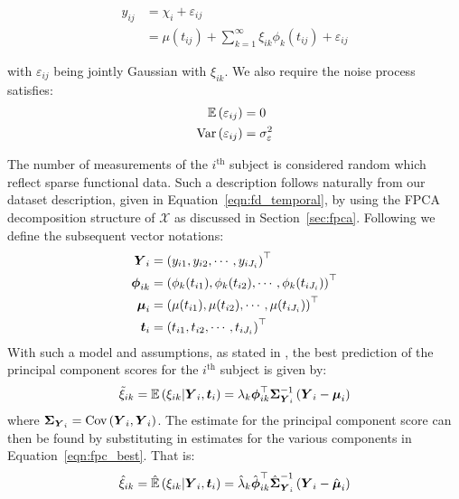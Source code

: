 \begin{align}
	y_{ij} &= \chi_{i} + \varepsilon_{ij} \\
	&= \mu(t_{ij}) + \sum_{k=1}^{\infty} \xi_{ik} \phi_k(t_{ij}) + \varepsilon_{ij} \label{eqn:fd_temporal_fpca}
\end{align}

with $\varepsilon_{ij}$ being jointly Gaussian with $\xi_{ik}$.
We also require the noise process satisfies:
\begin{align}
	\operatorname{\mathbb{E}}\left(\varepsilon_{ij}\right) &= 0 \\
	\text{Var}\left( \varepsilon_{ij} \right) &= \sigma_\varepsilon^2
\end{align}

The number of measurements of the $i^\text{th}$ subject is considered random which reflect sparse functional data.
Such a description follows naturally from our dataset description, given in Equation~\eqref{eqn:fd_temporal}, by using the FPCA decomposition structure of $\mathcal{X}$ as discussed in Section~\ref{sec:fpca}.
Following \citep{yao_functional_2005} we define the subsequent vector notations:
\begin{align}
	\bm{{Y}}_{i} &= \left(y_{i1}, y_{i2}, \cdots, y_{iJ_i}\right)^\top \label{eqn:yvec}\\
	\bm{{\phi}}_{ik} &= \left(\phi_{k}(t_{i1}), \phi_{k}(t_{i2}), \cdots, \phi_k(t_{iJ_i}) \right)^\top \label{eqn:phivec} \\
	\bm{{\mu}}_{i} &= \left(\mu(t_{i1}), \mu(t_{i2}), \cdots, \mu(t_{iJ_i})\right)^\top \label{eqn:muvec}\\
	\bm{{t}}_{i} &= \left( t_{i1}, t_{i2}, \cdots, t_{iJ_i} \right)^\top \label{eqn:tvec}
\end{align}
With such a model and assumptions, as stated in \citep{yao_functional_2005}, the best prediction of the principal component scores for the $i^\text{th}$  subject is given by:
\begin{equation}\label{eqn:fpc_best}
	\tilde{\xi}_{ik} = \operatorname{\mathbb{E}}\left(\xi_{ik} | \bm{{Y}}_{i}, \bm{{t}}_{i} \right) = \lambda_k \bm{{\phi}}_{ik}^{\top} \bm{{\Sigma}}_{\bm{{Y}}_{i}}^{-1} \left( \bm{{Y}}_{i} - \bm{{\mu}}_{i} \right)
\end{equation}
where $\bm{{\Sigma}}_{\bm{{Y}}_{i}} = \text{Cov}\left(\bm{{Y}}_{i}, \bm{{Y}}_{i} \right)$.
The estimate for the principal component score can then be found by substituting in estimates for the various components in Equation~\eqref{eqn:fpc_best}.
That is:
\begin{equation}\label{eqn:fpc_est}
	\hat{\xi}_{ik}= \hat{\operatorname{\mathbb{E}}}\left(\xi_{ik} | \bm{{Y}}_{i}, \bm{{t}}_{i} \right) = \hat\lambda_k \hat{\bm{{\phi}}}_{ik}^{\top} \hat{\bm{{\Sigma}}}_{\bm{{Y}}_{i}}^{-1} \left( \bm{{Y}}_{i} - \hat{\bm{{\mu}}}_{i} \right)
\end{equation}
